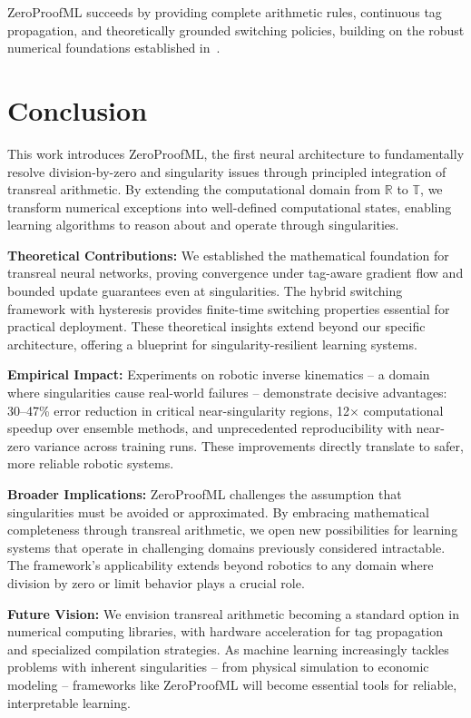 \documentclass[twoside,11pt]{article}
\begin{document}
ZeroProofML succeeds by providing complete arithmetic rules, continuous tag propagation, and theoretically grounded switching policies, building on the robust numerical foundations established in~\citet{higham2002accuracy,trefethen1997numerical}.

\section{Conclusion}

This work introduces ZeroProofML, the first neural architecture to fundamentally resolve division-by-zero and singularity issues through principled integration of transreal arithmetic. By extending the computational domain from $\mathbb{R}$ to $\mathbb{T}$, we transform numerical exceptions into well-defined computational states, enabling learning algorithms to reason about and operate through singularities.

\textbf{Theoretical Contributions:} We established the mathematical foundation for transreal neural networks, proving convergence under tag-aware gradient flow and bounded update guarantees even at singularities. The hybrid switching framework with hysteresis provides finite-time switching properties essential for practical deployment. These theoretical insights extend beyond our specific architecture, offering a blueprint for singularity-resilient learning systems.

\textbf{Empirical Impact:} Experiments on robotic inverse kinematics -- a domain where singularities cause real-world failures -- demonstrate decisive advantages: 30--47\% error reduction in critical near-singularity regions, 12$\times$ computational speedup over ensemble methods, and unprecedented reproducibility with near-zero variance across training runs. These improvements directly translate to safer, more reliable robotic systems.

\textbf{Broader Implications:} ZeroProofML challenges the assumption that singularities must be avoided or approximated. By embracing mathematical completeness through transreal arithmetic, we open new possibilities for learning systems that operate in challenging domains previously considered intractable. The framework's applicability extends beyond robotics to any domain where division by zero or limit behavior plays a crucial role.

\textbf{Future Vision:} We envision transreal arithmetic becoming a standard option in numerical computing libraries, with hardware acceleration for tag propagation and specialized compilation strategies. As machine learning increasingly tackles problems with inherent singularities -- from physical simulation to economic modeling -- frameworks like ZeroProofML will become essential tools for reliable, interpretable learning.
\end{document}
